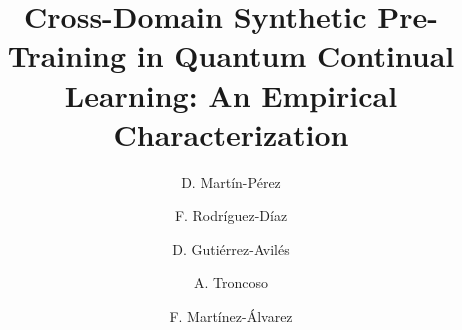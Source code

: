 \documentclass[preprint,number,sort&compress]{elsarticle}
\begin{document}
\begin{frontmatter}

\title{Cross-Domain Synthetic Pre-Training in Quantum Continual Learning: An Empirical Characterization}

\author[upo]{D. Mart\'in-P\'erez}
\author[upo]{F. Rodr\'iguez-D\'iaz}
\author[us]{D. Guti\'errez-Avil\'es}
\author[upo]{A. Troncoso}
\author[upo]{F. Mart\'inez-\'Alvarez}


\address[upo]{Data Science and Big Data Lab, Pablo de Olavide University, ES-41013 Seville, Spain}
\address[us]{Department of Computer Science, University of Seville, ES-41012 Seville, Spain}


\end{frontmatter}
\end{document}
